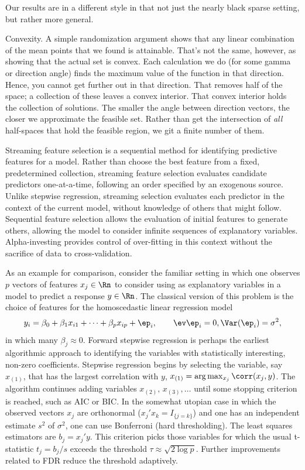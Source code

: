 \documentclass[12pt]{article}
\begin{document}
 
 Our results are in a different style in that not just the nearly black sparse
 setting, but rather more general.

 
 Convexity. A simple randomization argument shows that any linear combination of
 the mean points that we found is attainable.  That's not the same, however, as
 showing that the actual set is convex.  Each calculation we do (for some gamma
 or direction angle) finds the maximum value of the function in that direction.
  Hence, you cannot get further out in that direction. That removes half of the
 space; a collection of these leaves a convex interior.  That convex interior
 holds the collection of solutions.  The smaller the angle between direction
 vectors, the closer we approximate the feasible set.  Rather than get the
 intersection of {\em all} half-spaces that hold the feasible region, we git a
 finite number of them.




 Streaming feature selection is a sequential method for identifying predictive
 features for a model.  Rather than choose the best feature from a fixed,
 predetermined collection, streaming feature selection evaluates candidate
 predictors one-at-a-time, following an order specified by an exogenous source.
  Unlike stepwise regression, streaming selection evaluates each predictor in
 the context of the current model, without knowledge of others that might
 follow.  Sequential feature selection allows the evaluation of initial features
 to generate others, allowing the model to consider infinite sequences of
 explanatory variables. Alpha-investing provides control of over-fitting in this
 context without the sacrifice of data to cross-validation.


 As an example for comparison, consider the familiar setting in which one
 observes $p$ vectors of features $x_j \in \Rn$ to consider using as explanatory
 variables in a model to predict a response $y \in \Rn$.  The classical version
 of this problem is the choice of features for the homoscedastic linear
 regression model
 \begin{equation}
   y_i = \beta_0 + \beta_1 x_{i1} + \cdots + \beta_p x_{ip} + \ep_i, 
     \qquad \ev \ep_i = 0, \Var(\ep_i)=\sigma^2,
 \label{eq:homo}
 \end{equation}
 in which many $\beta_j \approx 0$.  Forward stepwise regression is perhaps the
 earliest algorithmic approach to identifying the variables with statistically
 interesting, non-zero coefficients.  Stepwise regression begins by selecting
 the variable, say $x_{(1)}$, that has the largest correlation with $y$,
 $x_{(1)} = \arg \max_{x_j} \corr(x_j,y)$.  The algorithm continues adding
 variables $x_{(2)},\, x_{(3)}, \ldots$ until some stopping criterion is
 reached, such as AIC or BIC.  In the somewhat utopian case in which the
 observed vectors $x_j$ are orthonormal ($x_j'x_k = I_{\{j=k\}}$) and one has an
 independent estimate $s^2$ of $\sigma^2$, one can use Bonferroni (hard
 thresholding).  The least squares estimators are $b_j = x_j'y.$ This criterion
 picks those variables for which the usual t-statistic $t_j = b_j/s$ exceeds the
 threshold $\tau \approx \sqrt{2 \log p}$.  Further improvements related
 to FDR reduce the threshold adaptively.
\end{document}
